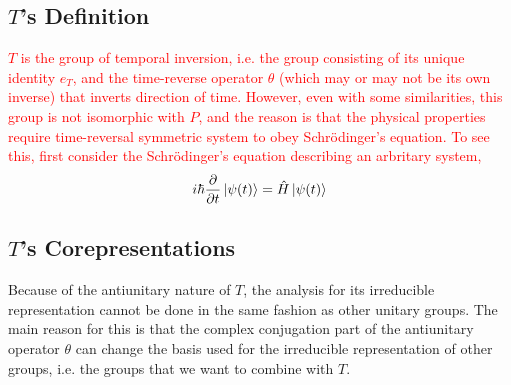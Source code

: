 \documentclass[preprint, 12pt]{revtex4-2}
\numberwithin{equation}{section}
\begin{document}
\subsection{$T$'s Definition}

\textcolor{red}
{
$T$ is the group of temporal inversion, i.e. the group consisting of its unique identity $e_T$, and the time-reverse operator $\theta$ (which may or may not be its own inverse) that inverts direction of time. However, even with some similarities, this group is not isomorphic with $P$, and the reason is that the physical properties require time-reversal symmetric system to obey Schr\"odinger's equation. To see this, first consider the Schr\"odinger's equation describing an arbritary system,
\begin{equation}\label{eq:Schrodinger}
    i\hbar\dfrac{\partial}{\partial t}\ket{\psi(t)} = \hat{H}\ket{\psi(t)}
\end{equation}}

\subsection{$T$'s Corepresentations}
Because of the antiunitary nature of $T$, the analysis for its irreducible representation cannot be done in the same fashion as other unitary groups. The main reason for this is that the complex conjugation part of the antiunitary operator $\theta$ can change the basis used for the irreducible representation of other groups, i.e. the groups that we want to combine with $T$.
\end{document}
